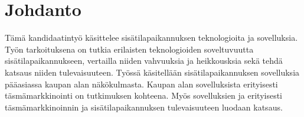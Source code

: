 \section{Johdanto}
Tämä kandidaatintyö käsittelee sisätilapaikannuksen teknologioita ja sovelluksia. Työn tarkoituksena on tutkia erilaisten teknologioiden soveltuvuutta sisätilapaikannukseen, vertailla niiden vahvuuksia ja heikkousksia sekä tehdä katsaus niiden tulevaisuuteen. Työssä käsitellään sisätilapaikannuksen sovelluksia pääasiassa kaupan alan näkökulmasta. Kaupan alan sovelluksista erityisesti täsmämarkkinointi on tutkimuksen kohteena. Myös sovelluksien ja erityisesti täsmämarkkinoinnin ja sisätilapaikannuksen tulevaisuuteen luodaan katsaus.